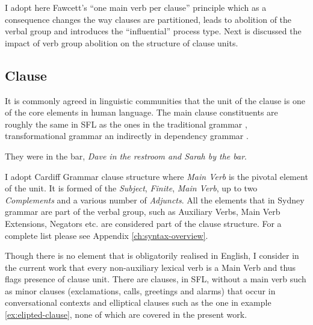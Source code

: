 I adopt here Fawcett's ``one main verb per clause'' principle which as a consequence changes the way clauses are partitioned, leads to abolition of the verbal group and introduces the ``influential'' process type. Next is discussed the impact of verb group abolition on the structure of clause units. 

\subsection{Clause}
\label{sec:cardiff-clause}
It is commonly agreed in linguistic communities that the unit of the clause is one of the core elements in human language. 
The main clause constituents are roughly the same in SFL as the ones in the traditional grammar \citep{Quirk1985}, transformational grammar \citep{Chomsky1957} an indirectly in dependency grammar \citep{Hudson2010}.



\begin{exe}
	\ex\label{ex:elipted-clause} They were in the bar, \textit{Dave in the restroom and Sarah by the bar}.
\end{exe}

I adopt Cardiff Grammar clause structure where \textit{Main Verb} is the pivotal element of the unit. It is formed of the \textit{Subject}, \textit{Finite}, \textit{Main Verb}, up to two \textit{Complements} and a various number of \textit{Adjuncts}. All the elements that in Sydney grammar are part of the verbal group, such as Auxiliary Verbs, Main Verb Extensions, Negators etc. are considered part of the clause structure. For a complete list please see Appendix \ref{ch:syntax-overview}.

Though there is no element that is obligatorily realised in English, I consider in the current work that every non-auxiliary lexical verb is a Main Verb and thus flags presence of clause unit. There are clauses, in SFL, without a main verb such as minor clauses (exclamations, calls, greetings and alarms) that occur in conversational contexts and elliptical clauses \citet{Halliday2013} such as the one in example \ref{ex:elipted-clause}, none of which are covered in the present work.


